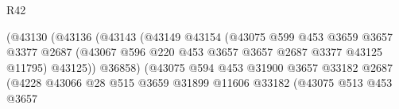 \begin{lexlean}{R42}
\begin{coremodule}
                                              (@43130
                                                (@43136
                                                  (@43143
                                                    (@43149
                                                      @43154
                                                      (@43075
                                                        @599
                                                        @453
                                                        @3659
                                                        @3657
                                                        @3377
                                                        @2687
                                                        (@43067
                                                          @596
                                                          @220
                                                          @453
                                                          @3657
                                                          @3657
                                                          @2687
                                                          @3377
                                                          @43125
                                                          @11795)
                                                        @43125))
                                                    @36858)
                                                  (@43075
                                                    @594
                                                    @453
                                                    @31900
                                                    @3657
                                                    @33182
                                                    @2687
                                                    (@4228
                                                      @43066
                                                      @28
                                                      @515
                                                      @3659
                                                      @31899
                                                      @11606
                                                      @33182
                                                      (@43075
                                                        @513
                                                        @453
                                                        @3657

\end{coremodule}
\end{lexlean}
